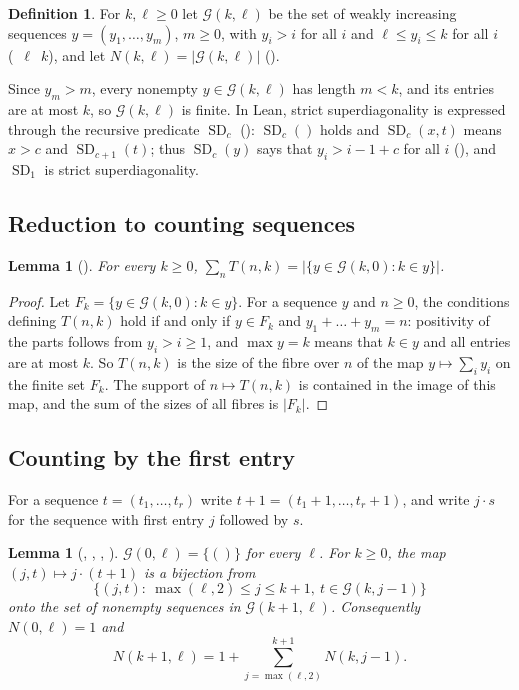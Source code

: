 \documentclass[11pt]{amsart}
\theoremstyle{plain}
\newtheorem{lemma}[theorem]{Lemma}
\theoremstyle{definition}
\newtheorem{definition}[theorem]{Definition}
\newcommand{\G}{\mathcal{G}}
\begin{document}
\begin{definition}
For $k,\ell\ge0$ let $\G(k,\ell)$ be the set of weakly increasing sequences $y=(y_1,\dots,y_m)$, $m\ge0$, with $y_i>i$ for all $i$ and $\ell\le y_i\le k$ for all $i$ (~$\ell$~$k$), and let $N(k,\ell)=|\G(k,\ell)|$ ().
\end{definition}

Since $y_m>m$, every nonempty $y\in\G(k,\ell)$ has length $m<k$, and its entries are at most $k$, so $\G(k,\ell)$ is finite. In Lean, strict superdiagonality is expressed through the recursive predicate $\operatorname{SD}_c$ (): $\operatorname{SD}_c()$ holds and $\operatorname{SD}_c(x,t)$ means $x>c$ and $\operatorname{SD}_{c+1}(t)$; thus $\operatorname{SD}_c(y)$ says that $y_i>i-1+c$ for all $i$ (), and $\operatorname{SD}_1$ is strict superdiagonality.

\subsection{Reduction to counting sequences}

\begin{lemma}[]\label{lem:colsum}
For every $k\ge0$, $\sum_nT(n,k)=\bigl|\{y\in\G(k,0): k\in y\}\bigr|$.
\end{lemma}

\begin{proof}
Let $F_k=\{y\in\G(k,0):k\in y\}$. For a sequence $y$ and $n\ge0$, the conditions defining $T(n,k)$ hold if and only if $y\in F_k$ and $y_1+\dots+y_m=n$: positivity of the parts follows from $y_i>i\ge1$, and $\max y=k$ means that $k\in y$ and all entries are at most $k$. So $T(n,k)$ is the size of the fibre over $n$ of the map $y\mapsto\sum_iy_i$ on the finite set $F_k$. The support of $n\mapsto T(n,k)$ is contained in the image of this map, and the sum of the sizes of all fibres is $|F_k|$.
\end{proof}

\subsection{Counting by the first entry}
For a sequence $t=(t_1,\dots,t_r)$ write $t+1=(t_1+1,\dots,t_r+1)$, and write $j\cdot s$ for the sequence with first entry $j$ followed by $s$.

\begin{lemma}[, , , ]\label{lem:enum}
$\G(0,\ell)=\{()\}$ for every $\ell$. For $k\ge0$, the map $(j,t)\mapsto j\cdot(t+1)$ is a bijection from
\[
  \{(j,t):\ \max(\ell,2)\le j\le k+1,\ t\in\G(k,j-1)\}
\]
onto the set of nonempty sequences in $\G(k+1,\ell)$. Consequently $N(0,\ell)=1$ and
\begin{equation}\label{eq:Nrec}
  N(k+1,\ell)=1+\sum_{j=\max(\ell,2)}^{k+1}N(k,j-1).
\end{equation}
\end{lemma}
\end{document}
